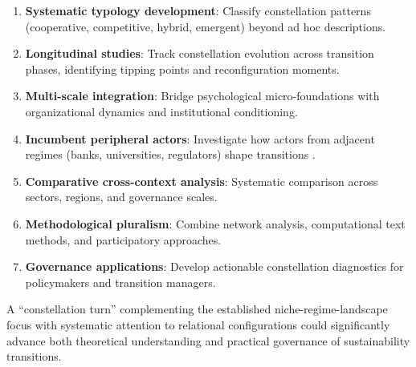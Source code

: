\begin{enumerate}[noitemsep,topsep=0pt]
    \item \textbf{Systematic typology development}: Classify constellation patterns (cooperative, competitive, hybrid, emergent) beyond ad hoc descriptions.
    \item \textbf{Longitudinal studies}: Track constellation evolution across transition phases, identifying tipping points and reconfiguration moments.
    \item \textbf{Multi-scale integration}: Bridge psychological micro-foundations with organizational dynamics and institutional conditioning.
    \item \textbf{Incumbent peripheral actors}: Investigate how actors from adjacent regimes (banks, universities, regulators) shape transitions \citep{coen2025view}.
    \item \textbf{Comparative cross-context analysis}: Systematic comparison across sectors, regions, and governance scales.
    \item \textbf{Methodological pluralism}: Combine network analysis, computational text methods, and participatory approaches.
    \item \textbf{Governance applications}: Develop actionable constellation diagnostics for policymakers and transition managers.
\end{enumerate}

A ``constellation turn'' complementing the established niche-regime-landscape focus with systematic attention to relational configurations could significantly advance both theoretical understanding and practical governance of sustainability transitions.



